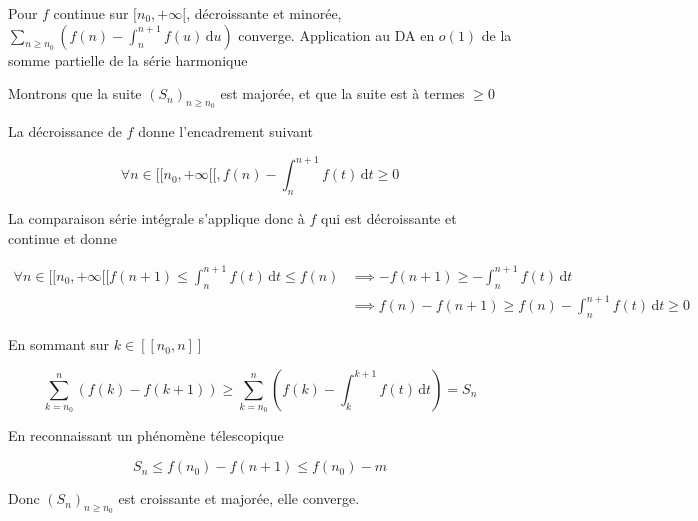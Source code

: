 \documentclass{article}
\renewenvironment{question_kholle}[2][ ]
{
	\subsection{\texorpdfstring{#2}{}}
	\notblank{#1}
	{
		\noindent #1
		\bigbreak
	}
	{}
	\begin{proof}
}
{
	\end{proof}
}
\begin{document}
\begin{question_kholle}[{Soit $n_{0} \in \N$ et $f:[n_{0}, +\infty[ \to \R$ une fonction continue, décroissante et minorée par $m \in \R$.
	Alors la série de terme général
	$$\left( f(n)- \int_{n}^{n+1} f(u) \, \mathrm du  \right)_{n\geqslant n_{0}}$$
	est à termes positifs ou nuls et converge.
	}]{Pour $f$ continue sur $[n_0, +\infty[$, décroissante et minorée, $\displaystyle\sum_{n\geqslant n_{0}}\left( f(n)- \int_{n}^{n+1} f(u) \, \mathrm du  \right)$ converge. Application au DA en $o(1)$ de la somme partielle de la série harmonique}

	Montrons que la suite $(S_{n})_{n\geqslant n_{0}}$ est majorée, et que la suite est à termes $\geqslant 0$

	La décroissance de $f$ donne l'encadrement suivant

	$$\forall n \in [ \! [ n_{0} , +\infty[\![,  f(n) - \int_{n}^{n+1} f(t) \, \mathrm dt \geqslant 0$$

	La comparaison série intégrale s'applique donc à $f$ qui est décroissante et continue et donne

	\begin{align*}
		\forall n \in [ \! [ n_{0}, +\infty [ \![ f(n+1)\leqslant \int_{n}^{n+1} f(t) \, \mathrm dt \leqslant f(n) & \implies -f(n+1) \geqslant -\int_{n}^{n+1} f(t) \, \mathrm dt                          \\
		                                                                                                           & \implies f(n) - f(n+1) \geqslant f(n) - \int_{ n}^{n+1} f(t) \, \mathrm dt \geqslant 0
	\end{align*}

	En sommant sur $k \in [ \! [ n_{0}, n ] \!]$

	$$\sum_{k=n_{0}}^{n} (f(k) - f(k+1)) \geqslant  \sum_{k=n_{0}}^{n}\left( f(k) - \int_{k}^{k+1} f(t) \, \mathrm dt  \right) = S_{n}$$

	En reconnaissant un phénomène télescopique

	$$S_{n} \leqslant f(n_{0})-f(n+1)\leqslant f(n_{0})- m $$

	Donc $(S_{n})_{n\geqslant n_{0}}$ est croissante et majorée, elle converge.
	\\

	\begin{figure}[H]
		\centering
\end{figure}
\end{question_kholle}
\end{document}
